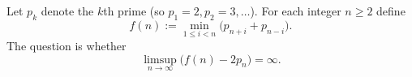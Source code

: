 Let $p_k$ denote the $k$th prime (so $p_1=2,p_2=3,\dots$). For each integer $n\ge 2$ define
\[
f(n):=\min_{1\le i<n}\big(p_{n+i}+p_{n-i}\big).
\]
The question is whether
\[
\limsup_{n\to\infty}\big(f(n)-2p_n\big)=\infty.
\]
